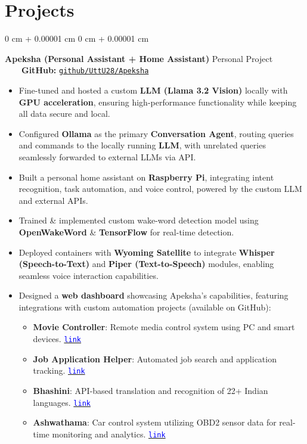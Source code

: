 \documentclass[10pt, letterpaper]{article}
\newenvironment{highlights}{
    \begin{itemize}[
        topsep=0.10 cm,
        parsep=0.10 cm,
        partopsep=0pt,
        itemsep=0pt,
        leftmargin=0 cm + 10pt
    ]
}{
    \end{itemize}
} %
\newenvironment{onecolentry}{
    \begin{adjustwidth}{
        0 cm + 0.00001 cm
    }{
        0 cm + 0.00001 cm
    }
}{
    \end{adjustwidth}
} %
\begin{document}
\vspace{0.3cm}

\section{Projects}
\vspace{0.05 cm}

\begin{onecolentry}
	\textbf{Apeksha (Personal Assistant + Home Assistant)} \hfill Personal Project \ \ \ \ \textbf{GitHub:} \href{https://github.com/UttU28/Apeksha}{\texttt{github/UttU28/Apeksha}}
	\begin{highlights}
		\item Fine-tuned and hosted a custom \textbf{LLM (Llama 3.2 Vision)} locally with \textbf{GPU acceleration}, ensuring high-performance functionality while keeping all data secure and local.
		\item Configured \textbf{Ollama} as the primary \textbf{Conversation Agent}, routing queries and commands to the locally running \textbf{LLM}, with unrelated queries seamlessly forwarded to external LLMs via API.
		\item Built a personal home assistant on \textbf{Raspberry Pi}, integrating intent recognition, task automation, and voice control, powered by the custom LLM and external APIs.
		\item Trained \& implemented custom wake-word detection model using \textbf{OpenWakeWord} \& \textbf{TensorFlow} for real-time detection.
		\item Deployed containers with \textbf{Wyoming Satellite} to integrate \textbf{Whisper (Speech-to-Text)} and \textbf{Piper (Text-to-Speech)} modules, enabling seamless voice interaction capabilities.
		\item Designed a \textbf{web dashboard} showcasing Apeksha's capabilities, featuring integrations with custom automation projects (available on GitHub):
		\begin{highlights}
			\item \textbf{Movie Controller}: Remote media control system using PC and smart devices. \href{https://github.com/UttU28/Movie_Controller_2}{\textcolor{blue}{\texttt{link}}}
			\item \textbf{Job Application Helper}: Automated job search and application tracking. \href{https://github.com/UttU28/Job-Application-Helper}{\textcolor{blue}{\texttt{link}}}
			\item \textbf{Bhashini}: API-based translation and recognition of 22+ Indian languages. \href{https://github.com/UttU28/Apeksha_Frontend/}{\textcolor{blue}{\texttt{link}}}
			\item \textbf{Ashwathama}: Car control system utilizing OBD2 sensor data for real-time monitoring and analytics. \href{https://github.com/UttU28/Apeksha_Frontend/}{\textcolor{blue}{\texttt{link}}}
		\end{highlights}


\end{highlights}
\end{onecolentry}
\end{document}
